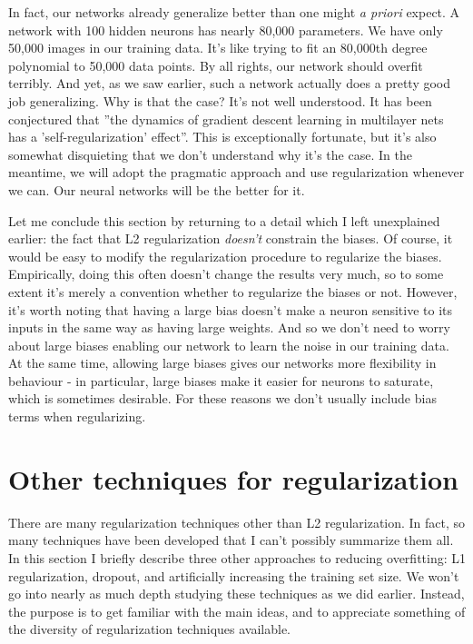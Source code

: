 In fact, our networks already generalize better than one might \textit{a priori} expect. A network with 100 hidden neurons has nearly 80,000 parameters. We have only 50,000 images in our training data. It's like trying to fit an 80,000th degree polynomial to 50,000 data points. By all rights, our network should overfit terribly. And yet, as we saw earlier, such a network actually does a pretty good job generalizing. Why is that the case? It's not well understood. It has been conjectured \cite{Lecun98gradient-basedlearning} that ''the dynamics of gradient descent learning in multilayer nets has a 'self-regularization' effect''. This is exceptionally fortunate, but it's also somewhat disquieting that we don't understand why it's the case. In the meantime, we will adopt the pragmatic approach and use regularization whenever we can. Our neural networks will be the better for it.

Let me conclude this section by returning to a detail which I left unexplained earlier: the fact that L2 regularization \textit{doesn't} constrain the biases. Of course, it would be easy to modify the regularization procedure to regularize the biases. Empirically, doing this often doesn't change the results very much, so to some extent it's merely a convention whether to regularize the biases or not. However, it's worth noting that having a large bias doesn't make a neuron sensitive to its inputs in the same way as having large weights. And so we don't need to worry about large biases enabling our network to learn the noise in our training data. At the same time, allowing large biases gives our networks more flexibility in behaviour - in particular, large biases make it easier for neurons to saturate, which is sometimes desirable. For these reasons we don't usually include bias terms when regularizing.


\section{Other techniques for regularization}
\label{sec:Othertechniquesforregularization}
There are many regularization techniques other than L2 regularization. In fact, so many techniques have been developed that I can't possibly summarize them all. In this section I briefly describe three other approaches to reducing overfitting: L1 regularization, dropout, and artificially increasing the training set size. We won't go into nearly as much depth studying these techniques as we did earlier. Instead, the purpose is to get familiar with the main ideas, and to appreciate something of the diversity of regularization techniques available.

